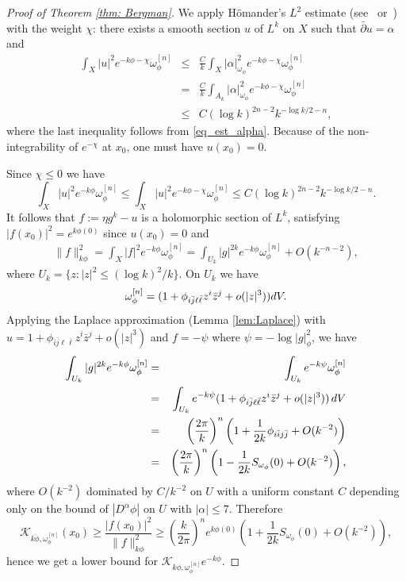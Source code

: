 \documentclass[a4paper, 11pt]{amsart}
\theoremstyle{plain}
\numberwithin{equation}{section} %
\numberwithin{figure}{section} %
\theoremstyle{plain}
\theoremstyle{plain}
\theoremstyle{plain}
\theoremstyle{plain}
\theoremstyle{remark}
\theoremstyle{definition}
\theoremstyle{definition}
\newcommand{\K}{\mathcal{K}}
\begin{document}
\begin{proof}[Proof of Theorem \ref{thm: Bergman}]
We apply  H\"omander's $L^2$ estimate (see~\cite[Chapter 4]{Hormander-book-complex} or~\cite[Proposition 1.1]{Tian90-metrics-algebraic}) with the weight $\chi$: there exists a smooth section 
$u$ of $L^k$ on $X$ such that $\bar \partial u= \alpha$  and 
\begin{eqnarray*}
 \int_X|u|^2e^{-k\phi-\chi}\omega_\phi^{[n]}
&\leq &\frac{C}{k}\int_X|\alpha|^2_{\omega_\phi} e^{-k\phi-\chi}\omega_\phi^{[n]}\\
&= &\frac{C}{k}\int_{A_k}|\alpha|^2_{\omega_\phi} e^{-k\phi-\chi}\omega_\phi^{[n]}\\
&\leq &C (\log k)^{2n-2}k^{-\log k/2-n },
\end{eqnarray*}
where the last inequality follows from \eqref{eq_est_alpha}.
Because of the non-integrability of $e^{-\chi}$ at $x_0$, one must have $u(x_0)=0$.

\smallskip
Since  $\chi\leq 0$ we have
$$\int_X | u |^2e^{-k \phi}\omega_\phi^{[n]} \leq \int_X|u|^2e^{-k\phi-\chi}\omega_\phi^{[n]} \leq C (\log k)^{2n-2}k^{-\log k/2-n }.$$
It follows that  $f:=\eta g^k -u$ is a holomorphic section of $L^k$,  
 satisfying $|f(x_0)|^2=e^{k\phi(0)}$ since $u(x_0)=0$  and 
\begin{eqnarray*}
\| f\|^2_{k\phi}=\int_X |f|^2 e^{-k\phi}\omega_\phi^{[n]}= \int_{U_k}|g|^{2k} e^{-k\phi}\omega_\phi^{[n]}+ O(k^{-n-2}),
\end{eqnarray*}
where  $U_k=\{z: |z|^2\leq (\log k)^2/k\}$.  On $U_k$ we have $$\omega_\phi^{[n]} = (1+ \phi_{i  \bar j\ell\bar\ell} z^i\bar z^j +o(|z|^3)){\rm d}V.$$
Applying the Laplace approximation (Lemma \ref{lem:Laplace}) with $u= 1+ \phi_{i  \bar j\ell\bar\ell} z^i\bar z^j +o(|z|^3)$ and $f=-\psi$ where $\psi = -\log|g|^2_\phi$,  we have
\begin{eqnarray*}
\int_{U_k} |g|^{2k} e^{-k\phi}\omega_\phi^{[n]} &=&  \int_{U_k}  e^{-k\psi}\omega_\phi^{[n]}  \\
&=& \int_{U_k} e^{-k \psi}  (1+ \phi_{i  \bar j\ell\bar\ell} z^i\bar z^j +o(|z|^3))\,{\rm d}V \\
&=&  \left(\frac{2\pi}{k}\right)^n \left( 1+ \frac{1}{2k} \phi_{i\bar i j\bar j }  + O(k^{-2}) \right)\\
&=&\left(\frac{2\pi}{k}\right)^n \left( 1- \frac{1}{2k} S_{\omega_\phi}(0)  + O(k^{-2}) \right),
\end{eqnarray*}
where $O\left({k^{-2}}\right) $ dominated by $C/k^{-2}$  on $U$ with a uniform constant $C$ depending only on the bound of $|D^\alpha\phi|$ on $U$ with $|\alpha|\leq 7$.  Therefore
\begin{equation*}
\K_{k\phi,\omega_\phi^{[n]}}(x_0)\geq \frac{ |f(x_0)|^2}{\|f\|^2_{k\phi}}\geq  \left(\frac{k}{2\pi}\right)^n e^{k\phi(0)}\left( 1+ \frac{1}{2k} S_{\omega_\phi}(0)  + O(k^{-2}) \right),
\end{equation*}
hence we get a lower bound for $\K_{k\phi,\omega_\phi^{[n]}}e^{-k\phi}$. 



\end{proof}
\end{document}
